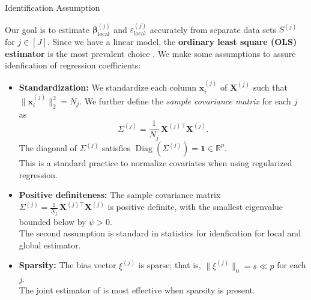 \documentclass{beamer}
\newcommand{\mb}[1]{{\mathbf{#1}}}
\newcommand{\txrd}[1]{{\textcolor{sintefred}{\textbf{#1}}}}
\begin{document}
\begin{frame}{Identification Assumption}

Our goal is to estimate $ {\bm \beta}^{(j)}_{\text{local}}$ and $\varepsilon_{\text{local}}^{(j)}$ accurately from separate data sets $S^{(j)}$ for $j \in [J]$. Since we have a linear model, the \txrd{ordinary least square (OLS) estimator} is the most prevalent choice \citet{bastani2021predicting}. We make some assumptions to assure idenfication of regression coefficients:
\begin{itemize}
    \item \txrd{Standardization:}
    We standardize each column $\bm x_i^{(j)}$ of $\mb X^{(j)}$ such that
    $\|\bm x_i^{(j)}\|_2^2 = N_j$.
    We further define the \textit{sample covariance matrix} for each $j$ as
    \[
        \Sigma^{(j)} = \frac{1}{N_j}\, \mb X^{(j)\top} \mb X^{(j)} .
    \]
    The diagonal of $\Sigma^{(j)}$ satisfies
    $\operatorname{Diag}(\Sigma^{(j)}) = \bm 1 \in \mathbb{R}^p$. \\ This is a standard practice to normalize covariates when using regularized regression.

    \item \txrd{Positive definiteness:}
    The sample covariance matrix
    \(
        \Sigma^{(j)} = \frac{1}{N_j}\, \mb X^{(j)\top} \mb X^{(j)}
    \)
    is positive definite, with the smallest eigenvalue bounded below by
    $\psi > 0$. \\ The second assumption is standard in statistics for idenfication for local and global estimator.

    \item \txrd{Sparsity:}
    The bias vector $\xi^{(j)}$ is sparse; that is,
    $\|\xi^{(j)}\|_0 = s \ll p$ for each $j$. \\ The joint estimator of \citet{bastani2021predicting} is most effective when sparsity is present.
\end{itemize}

\end{frame}

\end{document}
